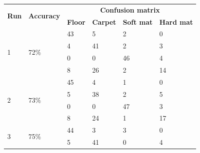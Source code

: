 \documentclass[USenglish]{ifimaster}  %
\begin{document}
\begin{table}[h]\ContinuedFloat
	\begin{subtable}[h]{1\textwidth} 
		\centering
		\captionsetup{justification=centering}
	\begin{tabular}{@{}llllll@{}}
		\toprule
		\multirow{2}{*}{\textbf{Run}} & \multirow{2}{*}{\textbf{Accuracy}} & \multicolumn{4}{c}{\textbf{Confusion matrix}} \\ \cmidrule(l){3-6} 
		&  & \multicolumn{1}{l|}{\textbf{Floor}} & \multicolumn{1}{l|}{\textbf{Carpet}} & \multicolumn{1}{l|}{\textbf{Soft mat}} & \textbf{Hard mat} \\ \midrule
		\multicolumn{1}{l|}{\multirow{4}{*}{1}} & \multicolumn{1}{l|}{\multirow{4}{*}{72\%}} & \multicolumn{1}{l|}{43} & \multicolumn{1}{l|}{5} & \multicolumn{1}{l|}{2} & 0 \\ \cmidrule(l){3-6} 
		\multicolumn{1}{l|}{} & \multicolumn{1}{l|}{} & \multicolumn{1}{l|}{4} & \multicolumn{1}{l|}{41} & \multicolumn{1}{l|}{2} & 3 \\ \cmidrule(l){3-6} 
		\multicolumn{1}{l|}{} & \multicolumn{1}{l|}{} & \multicolumn{1}{l|}{0} & \multicolumn{1}{l|}{0} & \multicolumn{1}{l|}{46} & 4 \\ \cmidrule(l){3-6} 
		\multicolumn{1}{l|}{} & \multicolumn{1}{l|}{} & \multicolumn{1}{l|}{8} & \multicolumn{1}{l|}{26} & \multicolumn{1}{l|}{2} & 14 \\ \midrule
		\multicolumn{1}{l|}{\multirow{4}{*}{2}} & \multicolumn{1}{l|}{\multirow{4}{*}{73\%}} & \multicolumn{1}{l|}{45} & \multicolumn{1}{l|}{4} & \multicolumn{1}{l|}{1} & 0 \\ \cmidrule(l){3-6} 
		\multicolumn{1}{l|}{} & \multicolumn{1}{l|}{} & \multicolumn{1}{l|}{5} & \multicolumn{1}{l|}{38} & \multicolumn{1}{l|}{2} & 5 \\ \cmidrule(l){3-6} 
		\multicolumn{1}{l|}{} & \multicolumn{1}{l|}{} & \multicolumn{1}{l|}{0} & \multicolumn{1}{l|}{0} & \multicolumn{1}{l|}{47} & 3 \\ \cmidrule(l){3-6} 
		\multicolumn{1}{l|}{} & \multicolumn{1}{l|}{} & \multicolumn{1}{l|}{8} & \multicolumn{1}{l|}{24} & \multicolumn{1}{l|}{1} & 17 \\ \midrule
		\multicolumn{1}{l|}{\multirow{4}{*}{3}} & \multicolumn{1}{l|}{\multirow{4}{*}{75\%}} & \multicolumn{1}{l|}{44} & \multicolumn{1}{l|}{3} & \multicolumn{1}{l|}{3} & 0 \\ \cmidrule(l){3-6} 
		\multicolumn{1}{l|}{} & \multicolumn{1}{l|}{} & \multicolumn{1}{l|}{5} & \multicolumn{1}{l|}{41} & \multicolumn{1}{l|}{0} & 4 \\ \cmidrule(l){3-6} 

\end{tabular}
\end{subtable}
\end{table}
\end{document}
